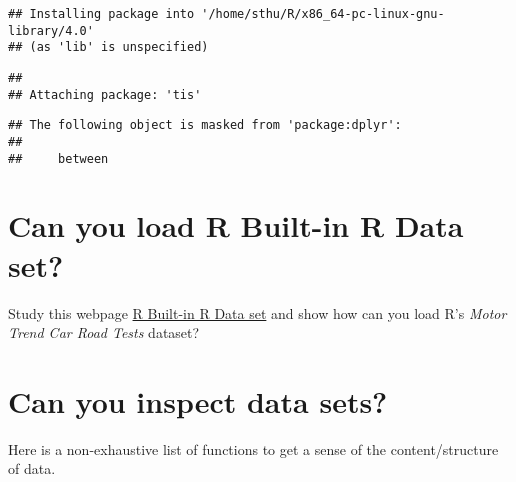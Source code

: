 \documentclass[
]{article}
\begin{document}
\begin{verbatim}
## Installing package into '/home/sthu/R/x86_64-pc-linux-gnu-library/4.0'
## (as 'lib' is unspecified)
\end{verbatim}

\begin{verbatim}
## 
## Attaching package: 'tis'
\end{verbatim}

\begin{verbatim}
## The following object is masked from 'package:dplyr':
## 
##     between
\end{verbatim}

\hypertarget{can-you-load-r-built-in-r-data-set}{%
\section{Can you load R Built-in R Data
set?}\label{can-you-load-r-built-in-r-data-set}}

Study this webpage
\href{https://rstudio-pubs-static.s3.amazonaws.com/481654_883a4b47c9b244d4859dd1db235f0165.html}{R
Built-in R Data set} and show how can you load R's \emph{Motor Trend Car
Road Tests} dataset?

\hypertarget{can-you-inspect-data-sets}{%
\section{Can you inspect data sets?}\label{can-you-inspect-data-sets}}

Here is a non-exhaustive list of functions to get a sense of the
content/structure of data.
\end{document}
